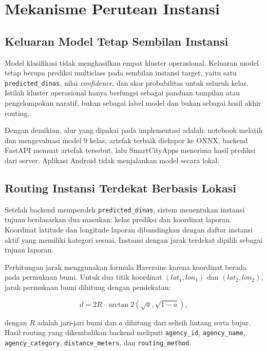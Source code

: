 \section{Mekanisme Perutean Instansi}
\label{sec:routing}

\subsection{Keluaran Model Tetap Sembilan Instansi}

Model klasifikasi tidak menghasilkan empat kluster operasional. Keluaran model tetap berupa prediksi multiclass pada sembilan instansi target, yaitu satu \texttt{predicted\_dinas}, nilai \textit{confidence}, dan skor probabilitas untuk seluruh kelas. Istilah kluster operasional hanya berfungsi sebagai panduan tampilan atau pengelompokan naratif, bukan sebagai label model dan bukan sebagai hasil akhir routing.

Dengan demikian, alur yang dipakai pada implementasi adalah: notebook melatih dan mengevaluasi model 9 kelas, artefak terbaik diekspor ke ONNX, backend FastAPI memuat artefak tersebut, lalu SmartCityApps menerima hasil prediksi dari server. Aplikasi Android tidak menjalankan model secara lokal.

\subsection{Routing Instansi Terdekat Berbasis Lokasi}

Setelah backend memperoleh \texttt{predicted\_dinas}, sistem menentukan instansi tujuan berdasarkan dua masukan: kelas prediksi dan koordinat laporan. Koordinat latitude dan longitude laporan dibandingkan dengan daftar instansi aktif yang memiliki kategori sesuai. Instansi dengan jarak terdekat dipilih sebagai tujuan laporan.

Perhitungan jarak menggunakan formula Haversine karena koordinat berada pada permukaan bumi. Untuk dua titik koordinat \((lat_1, lon_1)\) dan \((lat_2, lon_2)\), jarak permukaan bumi dihitung dengan pendekatan:

\begin{equation}
    d = 2R \cdot \arctan2(\sqrt{a}, \sqrt{1-a}),
\end{equation}

dengan \(R\) adalah jari-jari bumi dan \(a\) dihitung dari selisih lintang serta bujur. Hasil routing yang dikembalikan backend meliputi \texttt{agency\_id}, \texttt{agency\_name}, \texttt{agency\_category}, \texttt{distance\_meters}, dan \texttt{routing\_method}.

